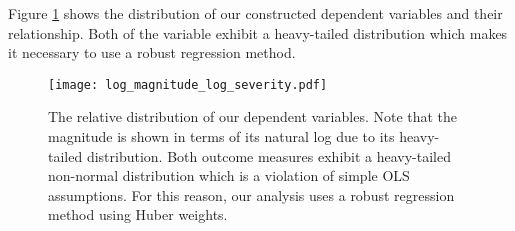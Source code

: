 Figure \ref{log_magnitude_log_severity} shows the distribution of our constructed dependent variables and their relationship. Both of the variable exhibit a heavy-tailed distribution which makes it necessary to use a robust regression method.

\begin{figure}
\centering
\texttt{[image: log\_magnitude\_log\_severity.pdf]}
\caption{The relative distribution of our dependent variables. Note that the magnitude is shown in terms of its natural log due to its heavy-tailed distribution. Both outcome measures exhibit a heavy-tailed non-normal distribution which is a violation of simple OLS assumptions. For this reason, our analysis uses a robust regression method using Huber weights.}
\label{log_magnitude_log_severity}
\end{figure}